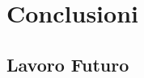 \chapter{Conclusioni}
\label{cha:conclusioni}

\lipsum[1]

\section{Lavoro Futuro}
\label{sec:lavoro_futuro}
\lipsum[2]